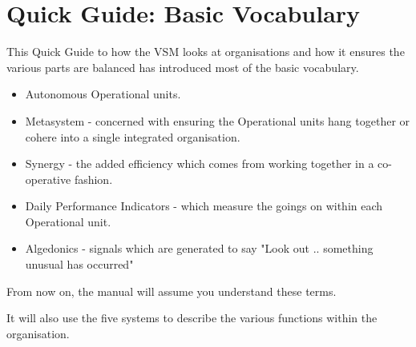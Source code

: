 \section*{Quick Guide: Basic Vocabulary}
This Quick Guide to how the VSM looks at organisations and how it ensures the various parts are balanced has introduced most of the basic vocabulary.

\begin{itemize}
  \item Autonomous Operational units.

  \item Metasystem - concerned with ensuring the Operational units hang together or cohere into a single integrated organisation.

  \item Synergy - the added efficiency which comes from working together in a co-operative fashion.

  \item Daily Performance Indicators - which measure the goings on within each Operational unit.

  \item Algedonics - signals which are generated to say "Look out .. something unusual has occurred"

\end{itemize}

From now on, the manual will assume you understand these terms.

It will also use the five systems to describe the various functions within the organisation.
